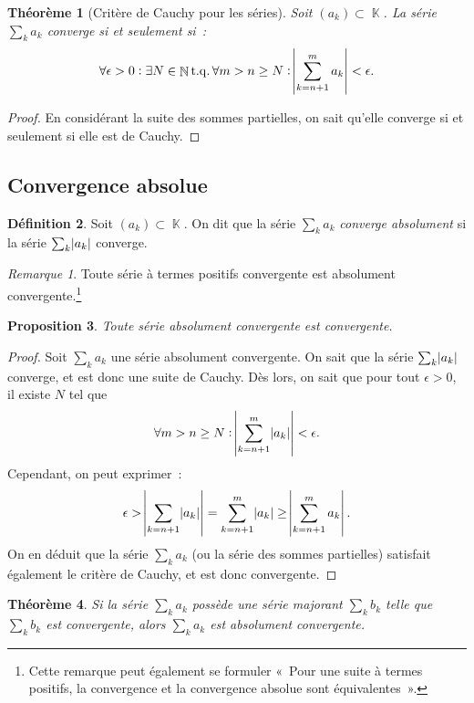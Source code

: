 \documentclass{article}
\DeclareMathOperator{\K}{\mathbb K}
\DeclareMathOperator{\N}{\mathbb N}
\DeclareMathOperator{\tq}{ t.q. }
\newtheorem{thm}{Théorème}[section]
\newtheorem{prp}[thm]{Proposition}
\theoremstyle{definition}
\newtheorem{déf}[thm]{Définition}
\theoremstyle{remark}
\newtheorem*{rmq}{Remarque}
\begin{document}
		\begin{thm}[Critère de Cauchy pour les séries] Soit $(a_k) \subset \K$. La série $\sum_k a_k$ converge si et seulement si~:
		\[\forall \epsilon > 0 : \exists N \in \N \tq \forall m > n \geq N : \abs {\sum_{k=n+1}^m a_k} < \epsilon.\]
		\end{thm}

		\begin{proof} En considérant la suite des sommes partielles, on sait qu'elle converge si et seulement si elle est de Cauchy. \end{proof}

	\subsection{Convergence absolue}
		\begin{déf} Soit $(a_k) \subset \K$. On dit que la série $\sum_k a_k$ \emph{converge absolument} si la série $\sum_k \abs {a_k}$ converge.
		\end{déf}

		\begin{rmq} Toute série à termes positifs convergente est absolument convergente.\footnote{Cette remarque peut également se formuler «~Pour une suite
		à termes positifs, la convergence et la convergence absolue sont équivalentes~».}
		\end{rmq}

		\begin{prp} Toute série absolument convergente est convergente. \end{prp}

		\begin{proof} Soit $\sum_k a_k$ une série absolument convergente. On sait que la série $\sum_k \abs {a_k}$ converge, et est donc une suite de Cauchy.
		Dès lors, on sait que pour tout $\epsilon > 0$, il existe $N$ tel que~
		\[\forall m > n \geq N : \abs {\sum_{k=n+1}^m\abs {a_k}} < \epsilon.\]
		Cependant, on peut exprimer~:
		\[\epsilon > \abs {\sum_{k=n+1}\abs {a_k}} = \sum_{k=n+1}^m\abs {a_k} \geq \abs {\sum_{k=n+1}^m a_k}.\]
		On en déduit que la série $\sum_k a_k$ (ou la série des sommes partielles) satisfait également le critère de Cauchy, et est donc convergente.
		\end{proof}

		\begin{thm} Si la série $\sum_k a_k$ possède une série majorant $\sum_k b_k$ telle que $\sum_k b_k$ est convergente, alors $\sum_k a_k$ est absolument
		convergente.
		\end{thm}
\end{document}
